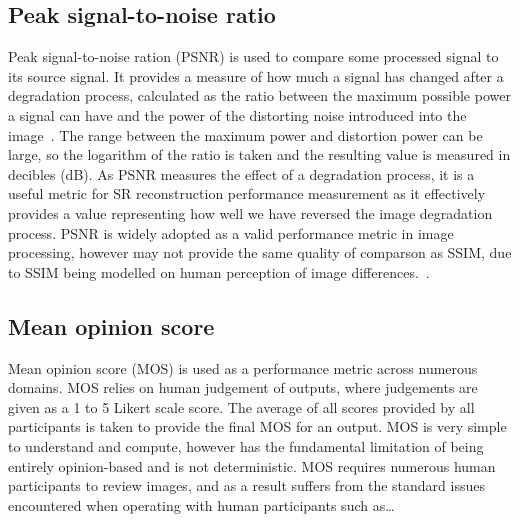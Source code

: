 \subsection{Peak signal-to-noise ratio}
Peak signal-to-noise ration (PSNR) is used to compare some processed signal to its source signal. It provides a measure of how much a signal has changed after a degradation process, calculated as the ratio between the maximum possible power a signal can have and the power of the distorting noise introduced into the image~\cite{psnr}. The range between the maximum power and distortion power can be large, so the logarithm of the ratio is taken and the resulting value is measured in decibles (dB). As PSNR measures the effect of a degradation process, it is a useful metric for SR reconstruction performance measurement as it effectively provides a value representing how well we have reversed the image degradation process. PSNR is widely adopted as a valid performance metric in image processing, however may not provide the same quality of comparson as SSIM, due to SSIM being modelled on human perception of image differences.~\cite{psnrAnalysis}.

\subsection{Mean opinion score}
Mean opinion score (MOS) is used as a performance metric across numerous domains. MOS relies on human judgement of outputs, where judgements are given as a 1 to 5 Likert scale score. The average of all scores provided by all participants is taken to provide the final MOS for an output. MOS is very simple to understand and compute, however has the fundamental limitation of being entirely opinion-based and is not deterministic. MOS requires numerous human participants to review images, and as a result suffers from the standard issues encountered when operating with human participants such as\dots
